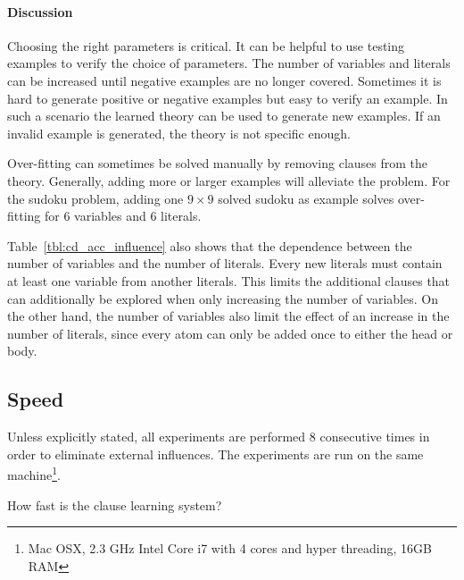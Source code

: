 \paragraph{Discussion}
	Choosing the right parameters is critical.
	It can be helpful to use testing examples to verify the choice of parameters.
	The number of variables and literals can be increased until negative examples are no longer covered.
	Sometimes it is hard to generate positive or negative examples but easy to verify an example.
	In such a scenario the learned theory can be used to generate new examples.
	If an invalid example is generated, the theory is not specific enough.

	Over-fitting can sometimes be solved manually by removing clauses from the theory.
	Generally, adding more or larger examples will alleviate the problem.
	For the sudoku problem, adding one $9 \times 9$ solved sudoku as example solves over-fitting for $6$ variables and $6$ literals.

	Table~\ref{tbl:cd_acc_influence} also shows that the dependence between the number of variables and the number of literals.
	Every new literals must contain at least one variable from another literals.
	This limits the additional clauses that can additionally be explored when only increasing the number of variables.
	On the other hand, the number of variables also limit the effect of an increase in the number of literals, since every atom can only be added once to either the head or body.
\subsection{Speed}

Unless explicitly stated, all experiments are performed $8$ consecutive times in order to eliminate external influences.
The experiments are run on the same machine\footnote{Mac OSX, 2.3 GHz Intel Core i7 with 4 cores and hyper threading, 16GB RAM}.

\begin{question}
	How fast is the clause learning system?
\end{question}

